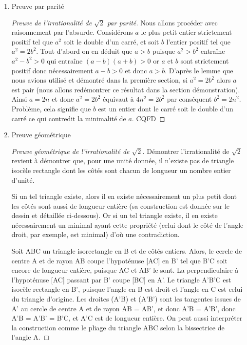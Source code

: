 \documentclass[a4paper, 11pt, twoside]{book}
\begin{document}
\begin{enumerate}
\item Preuve par parité
\label{sec:org254762c}

\begin{proof}[Preuve de l'irrationalité de $\sqrt{2}$ par parité]
Nous allons procéder avec raisonnement par l'absurde. Considérons
\(a\) le plus petit entier strictement positif tel que \(a^2\) soit
le double d'un carré, et soit \(b\) l'entier positif tel que \(a^2 =
     2b^2\). Tout d'abord on en déduit que \(a > b\) puisque \(a^2 > b^2\)
entraîne \(a^2 - b^2 > 0\) qui entraîne \((a - b)(a + b) > 0\) or \(a\)
et \(b\) sont strictement positif donc nécessairement \(a - b > 0\)
et donc \(a > b\). D'après le lemme que nous avions utilisé et
démontré dans la première section, si \(a^2 = 2b^2\) alors \(a\) est
pair (nous allons redémontrer ce résultat dans la section
démonstration). Ainsi \(a = 2n\) et donc \(a^2 = 2b^2\) équivaut à
\(4n^2 = 2b^2\) par conséquent \(b^2 = 2n^2\). Problème, cela
signifie que \(b\) est un entier dont le carré soit le double d'un
carré ce qui contredit la minimalité de \(a\). CQFD
\end{proof}



\item Preuve géométrique
\label{sec:org20486e6}

\begin{proof}[Preuve géométrique de l'irrationalité de $\sqrt{2}$]
Démontrer l'irrationalité de \(\sqrt{2}\) revient à démontrer que,
pour une unité donnée, il n'existe pas de triangle isocèle
rectangle dont les côtés sont chacun de longueur un nombre entier
d'unité.

Si un tel triangle existe, alors il en existe nécessairement un
plus petit dont les côtés sont aussi de longueur entière (sa
construction est donnée sur le dessin et détaillée
ci-dessous). Or si un tel triangle existe, il en existe
nécessairement un minimal ayant cette propriété (celui dont le
côté de l'angle droit, par exemple, est minimal) d'où une
contradiction.

Soit ABC un triangle isorectangle en B et de côtés
entiers. Alors, le cercle de centre A et de rayon AB coupe
l'hypoténuse [AC] en B' tel que B'C soit encore de longueur
entière, puisque AC et AB' le sont. La perpendiculaire à
l'hypoténuse [AC] passant par B' coupe [BC] en A'. Le triangle
A'B'C est isocèle rectangle en B', puisque l'angle en B est droit
et l'angle en C est celui du triangle d'origine. Les droites
(A'B) et (A'B') sont les tangentes issues de A' au cercle de
centre A et de rayon AB = AB', et donc A'B = A'B', donc A'B =
A'B' = B'C, et A'C est de longueur entière. On peut aussi
interpréter la construction comme le pliage du triangle ABC selon
la bissectrice de l'angle A.
\end{proof}


\end{enumerate}
\end{document}
